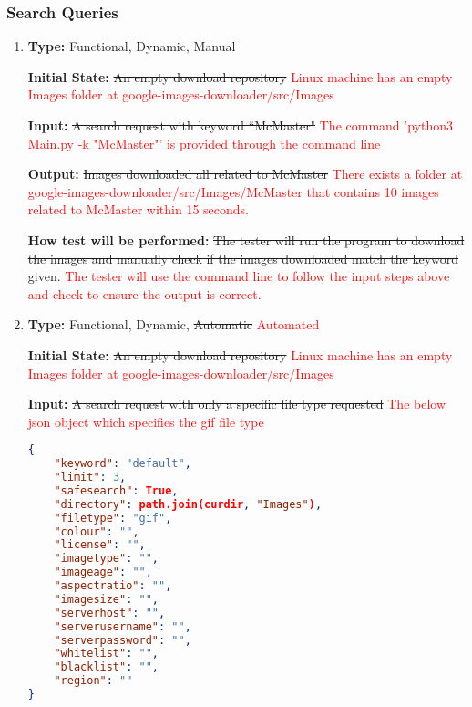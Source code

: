 \documentclass[12pt, titlepage]{article}
\begin{document}
\subsubsection{Search Queries}

\begin{enumerate}[label=FR-SQ\arabic*:, wide=0pt, leftmargin=*]

\item \phantom{empty}

\textbf{Type:} Functional, Dynamic, Manual

\textbf{Initial State:} \sout{An empty download repository} 
\textcolor{red}{Linux machine has an empty Images folder at google-images-downloader/src/Images}

\textbf{Input:} \sout{A search request with keyword ``McMaster"} 
\textcolor{red}{The command 'python3 Main.py -k "McMaster"' is provided through the command line}

\textbf{Output:} \sout{Images downloaded all related to McMaster}
\textcolor{red}{There exists a folder at google-images-downloader/src/Images/McMaster that contains
10 images related to McMaster within 15 seconds.}

\textbf{How test will be performed:} \sout{The tester will run the program to download the images and manually check if the images downloaded match the keyword given.}
\textcolor{red}{The tester will use the command line to follow the input steps above and check to ensure the output is correct.}

\item \phantom{empty}

\textbf{Type:} Functional, Dynamic, \sout{Automatic} \textcolor{red}{Automated}
					
\textbf{Initial State:} \sout{An empty download repository}
\textcolor{red}{Linux machine has an empty Images folder at google-images-downloader/src/Images}
					
\textbf{Input:} \sout{A search request with only a specific file type requested}
\textcolor{red}{The below json object which specifies the gif file type}
\begin{lstlisting}[language=json,firstnumber=1]
{
	"keyword": "default",
	"limit": 3,
	"safesearch": True,
	"directory": path.join(curdir, "Images"),
	"filetype": "gif",
	"colour": "",
	"license": "",
	"imagetype": "",
	"imageage": "",
	"aspectratio": "",
	"imagesize": "",
	"serverhost": "",
	"serverusername": "",
	"serverpassword": "",
	"whitelist": "",
	"blacklist": "",
	"region": ""
}
\end{lstlisting}
					

\end{enumerate}
\end{document}
